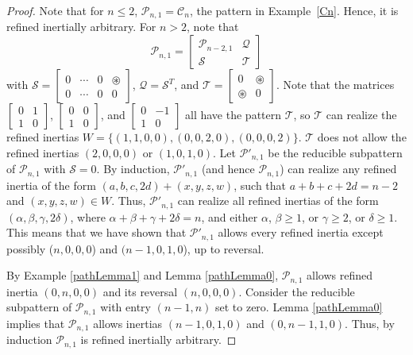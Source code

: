 \documentclass[10pt]{amsart}
\begin{document}
\begin{proof}
Note that for $n \leq 2$,  ${\mathcal{P}}_{n, 1} = {\mathcal{C}}_n$, the pattern in Example~\ref{Cn}. Hence, it is refined inertially arbitrary. For $n>2$, note that $${\mathcal{P}}_{n, 1} = \left[ \begin{array}{cc}
{\mathcal{P}}_{n-2, 1} 	& {\mathcal{Q}} \\
{\mathcal{S}} 			& {\mathcal{T}} \end{array} \right]$$ with ${\mathcal{S}} = \left[ \begin{array}{cccc}
0   & \cdots & 0 &{\circledast} \\
0   & \cdots & 0 & 0 \end{array} \right]$, ${\mathcal{Q}} = {\mathcal{S}}^T$, and ${\mathcal{T}} = \left[ \begin{array}{cc}
0   & {\circledast} \\
{\circledast} & 0 \end{array} \right]$.
	Note that the matrices $\left[ \begin{array}{cc}
0 & 1 \\
1 & 0 \end{array} \right]$, $\left[ \begin{array}{cc}
0 & 0 \\
1 & 0 \end{array} \right]$, and $\left[ \begin{array}{cc}
0 & -1 \\
1 & 0 \end{array} \right]$ all have the pattern ${\mathcal{T}}$, so ${\mathcal{T}}$ can realize the refined inertias $W = \{(1, 1, 0, 0), (0, 0, 2, 0), (0, 0, 0, 2)\}$. ${\mathcal{T}}$ does not allow the refined inertias $(2, 0, 0, 0)$ or $(1, 0, 1, 0)$. Let ${\mathcal{P}}'_{n, 1}$ be the reducible subpattern of ${\mathcal{P}}_{n, 1}$ with ${\mathcal{S}}=0$. 
	By induction, ${\mathcal{P}}'_{n, 1}$ (and hence ${\mathcal{P}}_{n, 1}$) can realize any refined inertia of the form $(a, b, c, 2d) + (x, y, z, w)$, such that $a+b+c+2d=n-2$ and $(x, y, z, w) \in W$. Thus, ${\mathcal{P}}'_{n, 1}$ can realize all refined inertias of the form $(\alpha, \beta, \gamma, 2\delta)$, where $\alpha + \beta + \gamma + 2\delta = n$, and either $\alpha$, $\beta \geq 1$, or $\gamma \geq 2$, or $\delta \geq 1$.
	This means that we have shown that ${\mathcal{P}}'_{n, 1}$ allows every refined inertia except possibly ($n, 0, 0, 0$) and $(n-1, 0, 1, 0$), up to reversal.
	
	By Example \ref{pathLemma1} and Lemma \ref{pathLemma0}, ${\mathcal{P}}_{n, 1}$ allows refined inertia $(0, n, 0, 0)$ and its reversal $(n, 0, 0, 0)$. Consider the reducible subpattern of ${\mathcal{P}}_{n, 1}$ with entry $(n-1, n)$ set to zero. 
	Lemma \ref{pathLemma0} implies that ${\mathcal{P}}_{n, 1}$ allows inertias $(n-1, 0, 1, 0)$ and $(0, n-1, 1, 0)$.
		Thus, by induction ${\mathcal{P}}_{n, 1}$ is refined inertially arbitrary.
	\end{proof}
\end{document}
